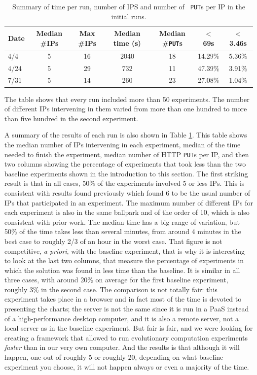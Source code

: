 \documentclass[journal,onecolumn]{IEEEtran}
\begin{document}
%
\begin{table}
\caption{Summary of time per run, number of IPS and number of {\tt
    PUT}s per IP in the initial runs. \label{tab:summary:os}}
\begin{center}
\begin{tabular}{l|cccccc}
\hline
Date & Median \#IPs & Max \#IPs & Median time (s) & Median \#{\tt PUT}s & $<$ 69s & $<$ 3.46s \\
\hline 
4/4 & 5 & 16 & 2040 & 18 & 14.29\% & 5.36\% \\
4/24 &  5 & 29 & 732 & 11 & 47.39\% & 3.91\% \\
7/31 & 5 & 14 & 260 & 23 & 27.08\% & 1.04\%  \\
\hline 
\end{tabular}
\end{center}
\end{table}
%
The table shows that every run included more than 50 experiments. The
number of different IPs intervening in them varied from more than one
hundred to more than five hundred in the second experiment. 

A summary of the results of each run is also shown in Table
\ref{tab:summary:os}. This table shows the median number of IPs
intervening in each experiment,  median of the time needed
to finish the experiment, median number of HTTP {\tt PUT}s per IP, and
then two columns showing the percentage of experiments that took less
than the two baseline experiments shown in the introduction to this
section. The first striking result is that in all cases, 50\% of the
experiments involved 5 or less IPs. This is consistent with results
found previously \cite{DBLP:conf/gecco/GuervosG15} which found 6 to be
the usual number of IPs that participated in an experiment. The
maximum number of different IPs for each experiment is also in the
same ballpark and of the order of 10, which is also consistent with
prior work. The median time has a big range of variation, but 50\% of
the time takes less than several minutes, from around 4 minutes in the
best case to roughly 2/3 of an hour in the worst case. That figure is
not competitive, {\em a priori}, with the baseline experiment, that is
why it is interesting to look at the last two columns, that measure
the percentage of experiments in which the solution was found in less
time than the baseline. It is similar in all three cases, with around
20\% on average for the first baseline experiment, roughly 3\% in the
second case. The comparison is not totally fair: this experiment takes
place in a browser and in fact most of the time is devoted to
presenting the charts; the server is not the same since it is run in a
PaaS instead of a high-performance desktop computer, and it is also a
remote server, not a local server as in the baseline experiment. But
fair is fair, and we were looking for creating a framework that
allowed to run evolutionary computation experiments {\em faster} than
in our very own computer. And the results is that although it will
happen, one out of roughly 5 or roughly 20, depending on what baseline
experiment you choose, it will not happen always or even a majority of
the time.
\end{document}
